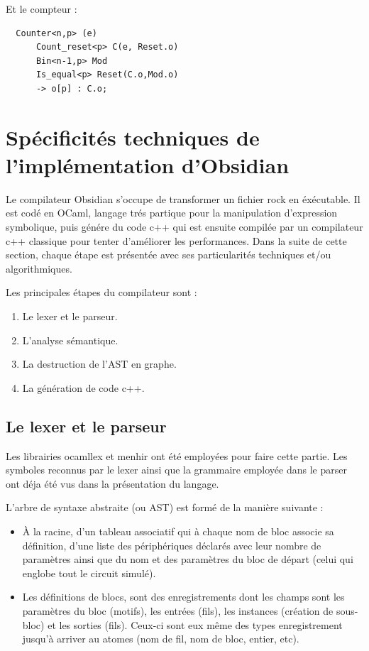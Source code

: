 \documentclass[13pt]{article}
\begin{document}
Et le compteur :
\begin{verbatim}
  Counter<n,p> (e)
      Count_reset<p> C(e, Reset.o)
      Bin<n-1,p> Mod
      Is_equal<p> Reset(C.o,Mod.o)
      -> o[p] : C.o;
\end{verbatim}


\section{Spécificités techniques de l'implémentation d'Obsidian}

Le compilateur Obsidian s'occupe de transformer un fichier rock en éxécutable.
Il est codé en OCaml, langage trés partique pour la manipulation d'expression
symbolique, puis génére du code c++ qui est ensuite compilée par un compilateur
c++ classique pour tenter d'améliorer les performances. Dans la suite de cette
section, chaque étape est présentée avec ses particularités techniques et/ou
algorithmiques.

Les principales étapes du compilateur sont :
\begin{enumerate}
\item Le lexer et le parseur.
\item L'analyse sémantique.
\item La \og destruction \fg{} de l'AST en graphe.
\item La génération de code c++.
\end{enumerate}

\subsection{Le lexer et le parseur}

Les librairies ocamllex et menhir ont été employées pour faire cette partie. Les
symboles reconnus par le lexer ainsi que la grammaire employée dans le parser
ont déja été vus dans la présentation du langage. 

L'arbre de syntaxe abstraite (ou AST) est formé de la manière suivante :
\begin{itemize}
\item À la racine, d'un tableau associatif qui à chaque nom de bloc associe sa
  définition, d'une liste des périphériques déclarés avec leur nombre de
  paramètres ainsi que du nom et des paramètres du bloc de départ (celui qui
  englobe tout le circuit simulé).
\item Les définitions de blocs, sont des enregistrements dont les champs sont
  les paramètres du bloc (motifs), les entrées (fils), les instances (création
  de sous-bloc) et les sorties (fils). Ceux-ci sont eux même des types
  enregistrement jusqu'à arriver au atomes (nom de fil, nom de bloc, entier, etc).
\end{itemize}
\end{document}
